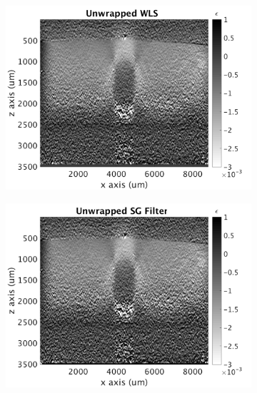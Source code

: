 \begin{figure}[h]
	\centering
    \begin{subfigure}{0.49\textwidth}
    	\centering
        \includegraphics[width=\textwidth]{appendix_figs/wls_fr40_lr20.png}
    \end{subfigure}
    \begin{subfigure}{0.49\textwidth}
    	\centering
        \includegraphics[width=\textwidth]{appendix_figs/uwsg_fr40_lr20.png}
    \end{subfigure}
    \\
    \begin{subfigure}{0.49\textwidth}
    	\centering

\end{subfigure}
\end{figure}

